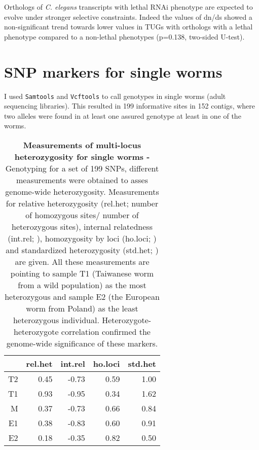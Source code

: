 
Orthologs of \textit{C. elegans} transcripts with lethal RNAi
phenotype are expected to evolve under stronger selective
constraints. Indeed the values of dn/ds showed a non-significant trend
towards lower values in TUGs with orthologs with a lethal phenotype
compared to a non-lethal phenotypes (p=0.138, two-sided U-test).

\section{SNP markers for single worms}
\label{sing-w}

I used \texttt{Samtools}\cite{journals/bioinformatics/LiHWFRHMAD09}
and \texttt{Vcftools}\cite{pmid21653522} to call genotypes in single
worms (adult sequencing libraries). This resulted in 199 informative
sites in 152 contigs, where two alleles were found in at least one
assured genotype at least in one of the worms.

\begin{table}[ht]
\begin{center}
\begin{tabular}{rrrrr}
  \hline
 & rel.het & int.rel & ho.loci & std.het \\ 
  \hline
T2 & 0.45 & -0.73 & 0.59 & 1.00 \\ 
  T1 & 0.93 & -0.95 & 0.34 & 1.62 \\ 
  M & 0.37 & -0.73 & 0.66 & 0.84 \\ 
  E1 & 0.38 & -0.83 & 0.60 & 0.91 \\ 
  E2 & 0.18 & -0.35 & 0.82 & 0.50 \\ 
   \hline
\end{tabular}
\caption[Measurements of multi-locus heterozygosity for single
worms]{\textbf{Measurements of multi-locus heterozygosity for single
    worms -} Genotyping for a set of 199 SNPs, different measurements
  were obtained to asses genome-wide heterozygosity.  Measurements for
  relative heterozygosity (rel.het; number of homozygous sites/ number
  of heterozygous sites), internal relatedness (int.rel;
  \cite{pmid11571049}), homozygosity by loci (ho.loci;
  \cite{pmid17107491}) and standardized heterozygosity (std.het;
  \cite{coltman81j}) are given.  All these measurements are pointing
  to sample T1 (Taiwanese worm from a wild population) as the most
  heterozygous and sample E2 (the European worm from Poland) as the
  least heterozygous individual. Heterozygote-heterozygote correlation
  \cite{pmid21565077} confirmed the genome-wide significance of these
  markers.}
\label{snp-sing}
\end{center}
\end{table}

